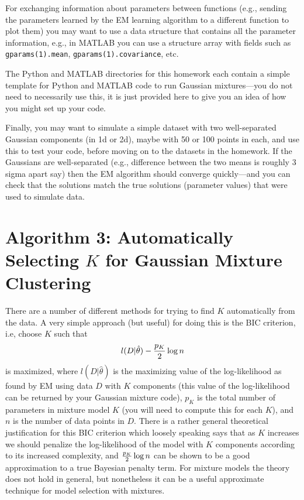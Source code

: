 \documentclass[11pt]{article}
\begin{document}
For exchanging information about parameters between functions (e.g., sending the parameters learned by the EM learning algorithm to a different function to plot them) you may want to use a data structure that contains all the parameter information, e.g., in MATLAB you can use a structure array with fields such as {\tt gparams(1).mean}, {\tt gparams(1).covariance}, etc.

The Python and MATLAB directories for this homework each contain a simple
template for Python and MATLAB code to run Gaussian mixtures---you do not need to necessarily use this, it is just provided here to give you an idea of how you might set up your code. 

Finally, you may want to simulate a simple dataset with two well-separated Gaussian components (in 1d or 2d), maybe with 50 or 100 points in each, and use this to test your code, before moving on to the datasets in the homework. If the Gaussians are well-separated (e.g., difference between the two means is roughly 3 sigma apart say) then the EM algorithm should converge quickly---and you can check that the solutions match  the true solutions (parameter values) that were used to simulate data.  



\section*{Algorithm 3: Automatically Selecting $K$ for Gaussian Mixture Clustering}
There are a number of different methods for trying to find $K$ automatically
from the data.  A very simple  approach (but useful) for doing
this is   the BIC criterion, i.e, choose $K$ such that
\[
l(D|\hat{\theta}) - {{p_K}\over 2} \log n
\]
is maximized, where $l(D|\hat{\theta})$ is the maximizing value of the
log-likelihood as found by EM using data $D$ with $K$ components (this value of
the log-likelihood can be returned by your Gaussian mixture code), $p_K$ is the
total number of parameters in mixture model $K$ (you will need to compute this
for each $K$), and  $n$ is the number of data points in $D$. There is a rather
general theoretical justification for this BIC criterion which loosely speaking
says that as $K$ increases we should penalize the log-likelihood of the model
with $K$ components according to its increased complexity, and ${{p_K}\over 2}
\log n$ can be shown to be a good approximation to a true Bayesian penalty
term. For mixture models the theory does not hold in general, but nonetheless
it can be a useful approximate technique for model selection with mixtures.
\end{document}

